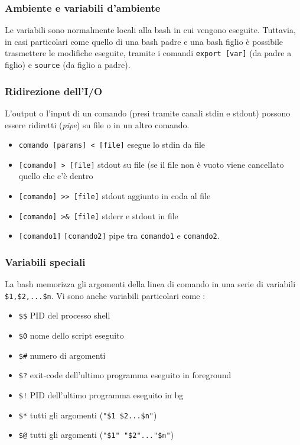 \documentclass[a4paper]{article}
\begin{document}
\subsubsection{Ambiente e variabili d'ambiente}
Le variabili sono normalmente locali alla bash in cui vengono eseguite. Tuttavia, in casi particolari come quello di una bash padre e una bash figlio è possibile trasmettere le modifiche eseguite, tramite i comandi \verb|export [var]| (da padre a figlio) e \verb|source| (da figlio a padre).

\subsubsection{Ridirezione dell'I/O}
L'output o l'input di un comando (presi tramite canali stdin e stdout) possono essere ridiretti (\textit{pipe}) su file o in un altro comando.
\begin{itemize}
\item \verb|comando [params] < [file]| esegue lo stdin da file
\item \verb|[comando] > [file]| stdout su file (se il file non è vuoto viene cancellato quello che c'è dentro
\item \verb|[comando] >> [file]| stdout aggiunto in coda al file
\item \verb|[comando] >& [file]| stderr e stdout in file
\item \verb|[comando1]| \textbar \verb|[comando2]| pipe tra \verb|comando1| e \verb|comando2|.
\end{itemize}

\subsubsection{Variabili speciali}
La bash memorizza gli argomenti della linea di comando in una serie di variabili \verb|$1,$2,...$n|. Vi sono anche variabili particolari come :
\begin{itemize}
\item \verb|$$| PID del processo shell
\item \verb|$0| nome dello script eseguito
\item \verb|$#| numero di argomenti
\item \verb|$?| exit-code dell'ultimo programma eseguito in foreground
\item \verb|$!| PID dell'ultimo programma eseguito in bg
\item \verb|$*| tutti gli argomenti (\verb|"$1 $2...$n"|)
\item \verb|$@| tutti gli argomenti (\verb|"$1" "$2"..."$n"|)
\end{itemize}
\end{document}
